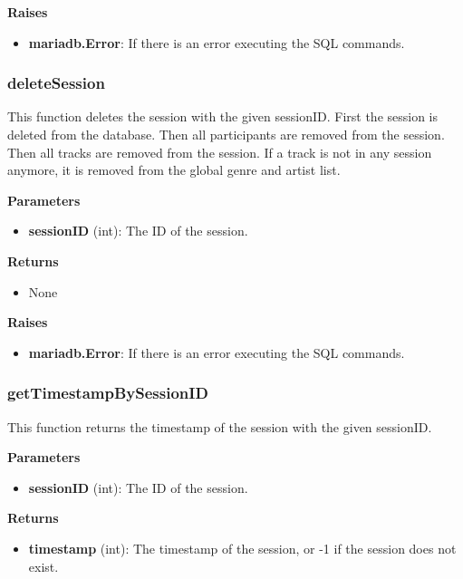 \documentclass[oneside, nenglish]{sdqtechreport}
\begin{document}
\begin{itemize}
\textbf{Raises}

\begin{itemize} \item \textbf{mariadb.Error}: If there is an error executing the SQL commands. \end{itemize}

\subsubsection{deleteSession}

This function deletes the session with the given sessionID. First the session is deleted from the database. Then all participants are removed from the session. Then all tracks are removed from the session. If a track is not in any session anymore, it is removed from the global genre and artist list.

\textbf{Parameters}

\begin{itemize} \item \textbf{sessionID} (int): The ID of the session. \end{itemize}

\textbf{Returns}

\begin{itemize} \item None \end{itemize}

\textbf{Raises}

\begin{itemize} \item \textbf{mariadb.Error}: If there is an error executing the SQL commands. \end{itemize}

\subsubsection{getTimestampBySessionID}

This function returns the timestamp of the session with the given sessionID.

\textbf{Parameters}

\begin{itemize} \item \textbf{sessionID} (int): The ID of the session. \end{itemize}

\textbf{Returns}

\begin{itemize} \item \textbf{timestamp} (int): The timestamp of the session, or -1 if the session does not exist. \end{itemize}


\end{itemize}
\end{document}
